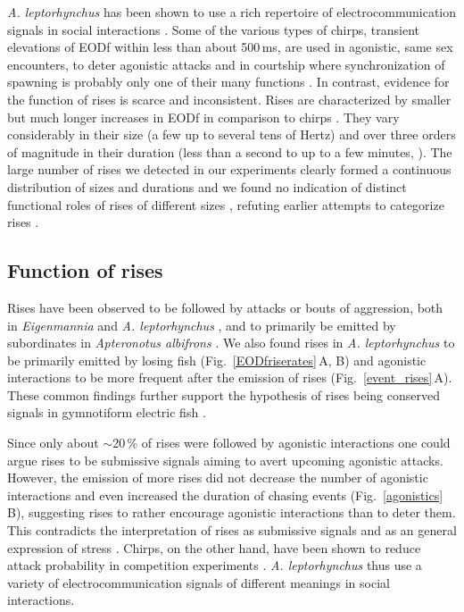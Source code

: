 \documentclass[vruler,JEB]{COB}%
\newcommand{\Albi}{\textit{Apteronotus albifrons}}
\newcommand{\lepto}{\textit{A. leptorhynchus}}
\newcommand{\panel}[1]{\textsf{#1}}
\newcommand{\subfref}[2]{\textup{\ref{#1}}\,\panel{#2}}
\newcommand{\Fig}{Fig.}
\newcommand{\Subfigref}[2]{\Fig~\subfref{#1}{#2}}
\newcommand{\Figb}{Fig.}
\newcommand{\Subfigrefb}[2]{\Figb~\subfref{#1}{#2}}
\begin{document}
\lepto{} has been shown to use a rich repertoire of electrocommunication signals in social interactions \citep{Smith2013,Benda2020}. Some of the various types of chirps, transient elevations of EODf within less than about 500\,ms, are used in agonistic, same sex encounters, to deter agonistic attacks \citep{Hupe2008,Henninger2018} and in courtship where synchronization of spawning is probably only one of their many functions \citep{Hagedorn1985, Triefenbach2003, Cuddy2012, Henninger2018}. In contrast, evidence for the function of rises is scarce and inconsistent. Rises are characterized by smaller but much longer increases in EODf in comparison to chirps \citep{Hopkins1974,Hagedorn1985}. They vary considerably in their size (a few up to several tens of Hertz) and over three orders of magnitude in their duration (less than a second to up to a few minutes, \citealp{Tallarovic2002}). The large number of rises we detected in our experiments clearly formed a continuous distribution of sizes and durations and we found no indication of distinct functional roles of rises of different sizes \citep{Triefenbach2008}, refuting earlier attempts to categorize rises \citep{Hagedorn1985, Tallarovic2002,Dye1987}.

\subsection{Function of rises}

Rises have been observed to be followed by attacks or bouts of aggression, both in \textit{Eigenmannia} \citep{Hopkins1974} and \lepto{} \citep{Triefenbach2008}, and to primarily be emitted by subordinates in \Albi{} \citep{Serrano2003}. We also found rises in \lepto{} to be primarily emitted by losing fish (\Subfigrefb{EODfriserates}{A, B}) and agonistic interactions to be more frequent after the emission of rises (\Subfigref{event_rises}{A}). These common findings further support the hypothesis of rises being conserved signals in gymnotiform electric fish \citep{Turner2007}. 

Since only about $\sim$20\,\% of rises were followed by agonistic interactions one could argue rises to be submissive signals aiming to avert upcoming agonistic attacks. However, the emission of more rises did not decrease the number of agonistic interactions and even increased the duration of chasing events (\Subfigrefb{agonistics}{B}), suggesting rises to rather encourage agonistic interactions than to deter them. This contradicts the interpretation of rises as submissive signals \citep{Hopkins1974,Serrano2003} and as an general expression of stress \citep{Smith2013}. Chirps, on the other hand, have been shown to reduce attack probability in competition experiments \citep{Hupe2008b}. \lepto{} thus use a variety of electrocommunication signals of different meanings in social interactions.
\end{document}
